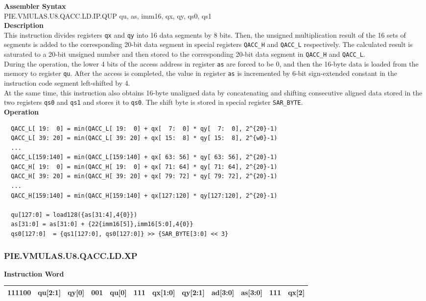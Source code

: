 \textbf{Assembler Syntax} \\
PIE.VMULAS.U8.QACC.LD.IP.QUP qu, as, imm16, qx, qy, qs0, qs1 \\
\textbf{Description} \\
This instruction divides registers \lstinline{qx} and \lstinline{qy} into 16 data segments by 8 bits. Then, the unsigned multiplication result of the 16 sets of segments is added to the corresponding 20-bit data segment in special registers \lstinline{QACC_H} and \lstinline{QACC_L} respectively. The calculated result is saturated to a 20-bit unsigned number and then stored to the corresponding 20-bit data segment in \lstinline{QACC_H} and \lstinline{QACC_L}.\\
During the operation, the lower 4 bits of the access address in register \lstinline{as} are forced to be 0, and then the 16-byte data is loaded from the memory to register \lstinline{qu}. After the access is completed, the value in register \lstinline{as} is incremented by 6-bit sign-extended constant in the instruction code segment left-shifted by 4.\\
At the same time, this instruction also obtains 16-byte unaligned data by concatenating and shifting consecutive aligned data stored in the two registers \lstinline{qs0} and \lstinline{qs1} and stores it to \lstinline{qs0}. The shift byte is stored in special register \lstinline{SAR_BYTE}.\\
\textbf{Operation}
\begin{lstlisting}
  QACC_L[ 19:  0] = min(QACC_L[ 19:  0] + qx[  7:  0] * qy[  7:  0], 2^{20}-1)
  QACC_L[ 39: 20] = min(QACC_L[ 39: 20] + qx[ 15:  8] * qy[ 15:  8], 2^{w0}-1)
  ...
  QACC_L[159:140] = min(QACC_L[159:140] + qx[ 63: 56] * qy[ 63: 56], 2^{20}-1)
  QACC_H[ 19:  0] = min(QACC_H[ 19:  0] + qx[ 71: 64] * qy[ 71: 64], 2^{20}-1)
  QACC_H[ 39: 20] = min(QACC_H[ 39: 20] + qx[ 79: 72] * qy[ 79: 72], 2^{20}-1)
  ...
  QACC_H[159:140] = min(QACC_H[159:140] + qx[127:120] * qy[127:120], 2^{20}-1)

  qu[127:0] = load128({as[31:4],4{0}})
  as[31:0] = as[31:0] + {22{imm16[5]},imm16[5:0],4{0}}
  qs0[127:0]  = {qs1[127:0], qs0[127:0]} >> {SAR_BYTE[3:0] << 3}
\end{lstlisting}

\newpage
\subsubsection{PIE.VMULAS.U8.QACC.LD.XP}\label{instruction:PIEVMULASU8QACCLDXP}
\setlength\tabcolsep{6pt}
\textbf{Instruction Word} \\
\begin{tabular}{|c|c|c|c|c|c|c|c|c|c|c|c|}
	\hline
	111100 & qu[2:1] & qy[0] & 001 & qu[0] & 111 & qx[1:0] & qy[2:1] & ad[3:0] & as[3:0] & 111 & qx[2] \\
	\hline
\end{tabular}

